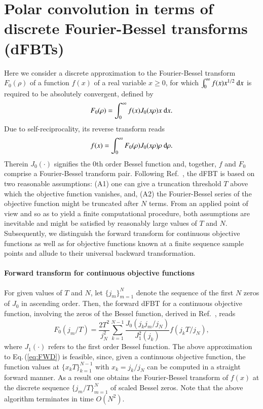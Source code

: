 \documentclass[review]{elsarticle}
\begin{document}
\section{Polar convolution in terms of discrete Fourier-Bessel transforms (dFBTs)}
\label{sec:dFBT}

Here we consider a discrete approximation to the Fourier-Bessel transform
$F_0(\rho)$ of a function $f(x)$ of a real variable $x\geq 0$, for which 
$\int_0^\infty f(x) x^{1/2}~{\rm d}x$ is required to be absolutely 
convergent, defined by 
\cite{Baddour:2009,Baddour:2015} 
\begin{equation}
F_0(\rho) = \int_0^\infty f(x) J_0(x\rho) x~{\rm{d}}x. \label{eq:FWD}
\end{equation}
Due to self-reciprocality, its reverse transform reads
\begin{equation}
f(x) = \int_0^\infty F_0(\rho) J_0(x\rho) \rho~{\rm{d}}\rho. \label{eq:BCKWD}
\end{equation}
Therein $J_0(\cdot)$ signifies the $0$th order Bessel function and, together,
$f$ and $F_0$ comprise a Fourier-Bessel transform pair.  Following
Ref.~\cite{FiskJohnson:1987}, the dFBT is based on two reasonable assumptions:
(A1) one can give a truncation threshold $T$ above which the objective function
vanishes, and, (A2) the Fourier-Bessel series of the objective function might
be truncated after $N$ terms.  From an applied point of view and so as to
yield a finite computational procedure, both assumptions are inevitable
and might be satisfied by reasonably large values of $T$ and $N$.
Subsequently, we distinguish the forward transform for continuous objective
functions as well as for objective functions known at a finite sequence sample
points and allude to their universal backward transformation.

\paragraph{Forward transform for continuous objective functions}

For given values of $T$ and $N$, let $\{j_m\}_{m=1}^N$ denote the sequence of the
first $N$ zeros of $J_0$ in ascending order. Then, the forward dFBT for a
continuous objective function, involving the zeros of the Bessel function, 
derived in Ref.~\cite{FiskJohnson:1987}, reads
\begin{equation}
F_0(j_m/T) = \frac{2 T^2}{j_N^2} \sum_{k=1}^{N-1} \frac{J_0(j_k j_m/ j_N)}{J_1^2(j_k)} f(j_k T/j_N), \label{eq:dFBTC}
\end{equation}
where $J_1(\cdot)$ refers to the first order Bessel function.  The above
approximation to Eq.\,(\ref{eq:FWD}) is feasible, since, given a continuous
objective function, the function values at $\{x_k T\}_{k=1}^{N-1}$ with
$x_k=j_k/j_N$ can be computed in a straight forward manner. As a result one
obtains the Fourier-Bessel transform of $f(x)$ at the discrete sequence
$\{j_m/T\}_{m=1}^N$ of scaled Bessel zeros.  Note that the above algorithm
terminates in time $O(N^2)$.
\end{document}
